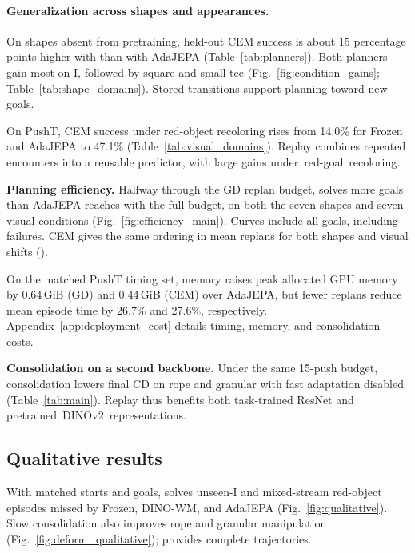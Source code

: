 \vspace{1mm}
\paragraph{Generalization across shapes and appearances.}
On shapes absent from pretraining, held-out CEM success is about 15 percentage points higher with \ours than with AdaJEPA (Table~\ref{tab:planners}). Both planners gain most on I, followed by square and small tee (Fig.~\ref{fig:condition_gains}; Table~\ref{tab:shape_domains}). Stored transitions support planning toward new goals.

On PushT, CEM success under red-object recoloring rises from 14.0\% for Frozen and AdaJEPA to 47.1\% (Table~\ref{tab:visual_domains}). Replay combines repeated encounters into a reusable predictor, with large gains \mbox{under red-goal recoloring}.

\vspace{1mm}
\noindent \textbf{Planning efficiency.}
Halfway through the GD replan budget, \ours solves more goals than AdaJEPA reaches with the full budget, on both the seven shapes and seven visual conditions (Fig.~\ref{fig:efficiency_main}). Curves include all goals, including failures. CEM gives the same ordering in mean replans for both shapes and visual shifts ().

On the matched PushT timing set, memory raises peak allocated GPU memory by 0.64\,GiB (GD) and 0.44\,GiB (CEM) over AdaJEPA, but fewer replans reduce mean episode time by 26.7\% and 27.6\%, respectively. Appendix~\ref{app:deployment_cost} details timing, memory, and consolidation costs.

\vspace{1mm}
\noindent \textbf{Consolidation on a second backbone.}
Under the same 15-push budget, consolidation lowers final CD on rope and granular with fast adaptation disabled (Table~\ref{tab:main}). Replay thus benefits both task-trained ResNet and \mbox{pretrained DINOv2 representations}.

\subsection{Qualitative results}
\label{sec:qualitative}

With matched starts and goals, \ours solves unseen-I and mixed-stream red-object episodes missed by Frozen, DINO-WM, and AdaJEPA (Fig.~\ref{fig:qualitative}). Slow consolidation also improves rope and granular manipulation (Fig.~\ref{fig:deform_qualitative});  provides complete trajectories.

